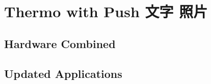\chapter{Thermo with Push 文字 照片} \label{chapter:Thermo with Push}

\section{Hardware Combined}

\section{Updated Applications}